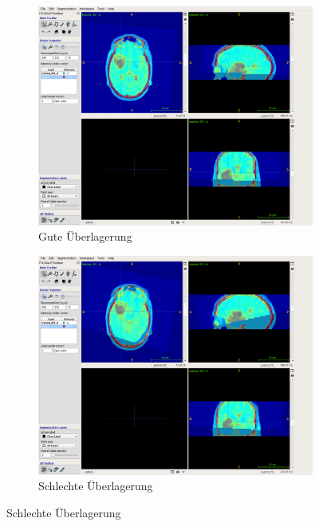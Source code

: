 \begin{figure}[ht]
  \caption{Qualitätsunterschiede bei verschiedenen Registrierungsstrategien}
  \label{pic:A3}
  \begin{subfigure}{\linewidth}
    \centering
    \includegraphics[height=0.44\textheight]{images/A3_good.png}
    \caption{Gute Überlagerung}
  \end{subfigure}
  \vfill
  \begin{subfigure}{\linewidth}
    \centering
    \includegraphics[height=0.44\textheight]{images/A3_bad.png}
    \caption{Schlechte Überlagerung}
  \end{subfigure}
\end{figure}

